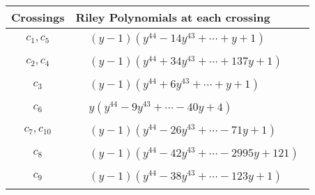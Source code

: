 \documentclass[1p]{elsarticle_modified}
\theoremstyle{definition}
\begin{document}
\begin{tabular}{m{50pt}|m{274pt}}
Crossings & \hspace{64pt}Riley Polynomials at each crossing \\
\hline $$\begin{aligned}c_{1},c_{5}\end{aligned}$$&$\begin{aligned}
&(y-1)(y^{44}-14 y^{43}+\cdots+y+1)
\end{aligned}$\\
\hline $$\begin{aligned}c_{2},c_{4}\end{aligned}$$&$\begin{aligned}
&(y-1)(y^{44}+34 y^{43}+\cdots+137 y+1)
\end{aligned}$\\
\hline $$\begin{aligned}c_{3}\end{aligned}$$&$\begin{aligned}
&(y-1)(y^{44}+6 y^{43}+\cdots+y+1)
\end{aligned}$\\
\hline $$\begin{aligned}c_{6}\end{aligned}$$&$\begin{aligned}
&y(y^{44}-9 y^{43}+\cdots-40 y+4)
\end{aligned}$\\
\hline $$\begin{aligned}c_{7},c_{10}\end{aligned}$$&$\begin{aligned}
&(y-1)(y^{44}-26 y^{43}+\cdots-71 y+1)
\end{aligned}$\\
\hline $$\begin{aligned}c_{8}\end{aligned}$$&$\begin{aligned}
&(y-1)(y^{44}-42 y^{43}+\cdots-2995 y+121)
\end{aligned}$\\
\hline $$\begin{aligned}c_{9}\end{aligned}$$&$\begin{aligned}
&(y-1)(y^{44}-38 y^{43}+\cdots-123 y+1)
\end{aligned}$\\
\hline
\end{tabular}
\vskip 2pc
\end{document}
